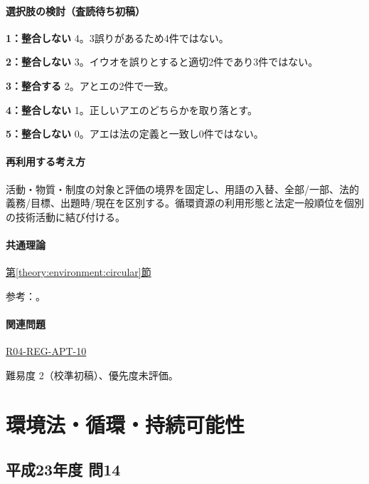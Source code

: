 \paragraph{選択肢の検討（査読待ち初稿）}\mbox{}\par

\noindent\textbf{1：整合しない} 4。3誤りがあるため4件ではない。\par

\noindent\textbf{2：整合しない} 3。イウオを誤りとすると適切2件であり3件ではない。\par

\noindent\textbf{3：整合する} 2。アとエの2件で一致。\par

\noindent\textbf{4：整合しない} 1。正しいアエのどちらかを取り落とす。\par

\noindent\textbf{5：整合しない} 0。アエは法の定義と一致し0件ではない。\par

\paragraph{再利用する考え方} 活動・物質・制度の対象と評価の境界を固定し、用語の入替、全部/一部、法的義務/目標、出題時/現在を区別する。循環資源の利用形態と法定一般順位を個別の技術活動に結び付ける。

\paragraph{共通理論} \hyperref[theory:environment:circular]{第\ref*{theory:environment:circular}節}

\par 参考：\cite{env_circular_law}。

\paragraph{関連問題} \hyperref[q:r04-reg-apt-10]{R04-REG-APT-10}

\par 難易度 2（校準初稿）、優先度未評価。

\section{環境法・循環・持続可能性}

\subsection{平成23年度 問14}
\label{q:h23-reg-apt-14}

